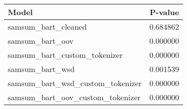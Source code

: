 \begin{tabular}{lr}
\toprule
Model & P-value \\
\midrule
samsum_bart_cleaned & 0.684862 \\
samsum_bart_oov & 0.000000 \\
samsum_bart_custom_tokenizer & 0.000000 \\
samsum_bart_wsd & 0.001539 \\
samsum_bart_wsd_custom_tokenizer & 0.000000 \\
samsum_bart_oov_custom_tokenizer & 0.000000 \\
\bottomrule
\end{tabular}
